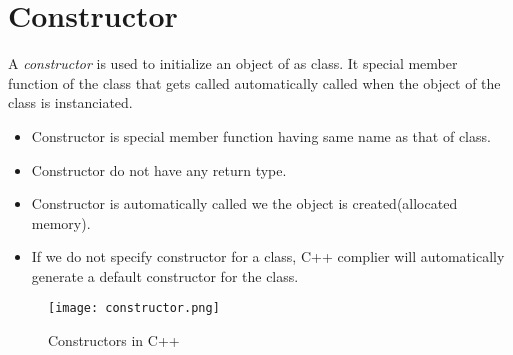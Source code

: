 \documentclass[oops.tex]{subfiles}
\begin{document}
\section{Constructor}

A \emph{constructor} is used to initialize an object of as class. It special
member function of the class that gets called automatically called when the
object of the class is instanciated. 
\begin{itemize}
    \item Constructor is special member function having same name as that of class.
    \item Constructor do not have any return type.
    \item Constructor is automatically called we the object is created(allocated memory).
    \item If we do not specify constructor for a class, C++ complier will
          automatically generate a default constructor for the class.
\end{itemize}

\begin{figure}[h]
    \begin{center}
        \caption{Constructors in C++}
        \texttt{[image: constructor.png]}
    \end{center}
\end{figure}
\end{document}

